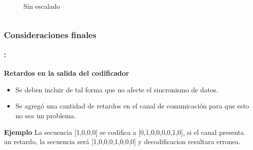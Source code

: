 \begin{frame}
\begin{columns}
\begin{column}{0.48\paperwidth}
\begin{figure}
    \caption{Sin escalado}
    \end{figure}
    \end{column}
\end{columns}
\end{frame}

\begin{frame}
  \frametitle{\textbf{Consideraciones finales}}
    \framesubtitle{\secname : \subsecname}

    \begin{block}{\centering \textbf{Retardos en la salida del codificador}}
     \begin{itemize}
     \item Se deben incluir de tal forma que no afecte el sincronismo de datos.
      \item Se agregó una cantidad de retardos en el canal de comunicación para que esto no sea un problema.
      \end{itemize}
     \end{block}
    \begin{block}{\centering \textbf{Ejemplo}}
    La secuencia [1,0,0,0] se codifica a [0,1,0,0,0,0,1,0], si el canal presenta un retardo, la secuencia será [1,0,0,0,1,0,0,0] y decodificacion resultara erronea. 
    \end{block}
\end{frame}



